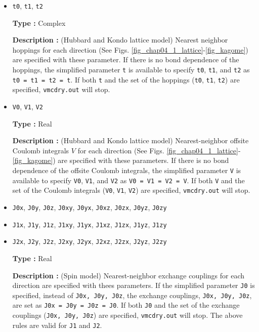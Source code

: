 \begin{itemize}
\item \verb|t0|,  \verb|t1|, \verb|t2|

{\bf Type :} Complex

{\bf Description :} (Hubbard and Kondo lattice model)
Nearest neighbor hoppings for each direction
(See Figs. \ref{fig_chap04_1_lattice}-\ref{fig_kagome})
are specified with these parameter.
If there is no bond dependence of the hoppings,
the simplified parameter \verb|t| is available to specify \verb|t0|,  \verb|t1|, and \verb|t2| as
\verb|t0 = t1 = t2 = t|.
If both \verb|t| and the set of the hoppings (\verb|t0|,  \verb|t1|, \verb|t2|) are specified,
\verb|vmcdry.out| will stop.

\item \verb|V0|,  \verb|V1|, \verb|V2|

{\bf Type :} Real

{\bf Description :} (Hubbard and Kondo lattice model)
Nearest-neighbor offsite Coulomb integrals $V$
 for each direction
(See Figs. \ref{fig_chap04_1_lattice}-\ref{fig_kagome})
are specified with these parameters.
If there is no bond dependence of the offsite Coulomb integrals,
the simplified parameter \verb|V| is available to specify \verb|V0|,  \verb|V1|, and \verb|V2| as
\verb|V0 = V1 = V2 = V|.
If both \verb|V| and the set of the Coulomb integrals (\verb|V0|,  \verb|V1|, \verb|V2|) are specified,
\verb|vmcdry.out| will stop.

\item \verb|J0x|, \verb|J0y|, \verb|J0z|, \verb|J0xy|, 
  \verb|J0yx|, \verb|J0xz|, \verb|J0zx|, \verb|J0yz|, \verb|J0zy|
\item \verb|J1x|, \verb|J1y|, \verb|J1z|, \verb|J1xy|, 
  \verb|J1yx|, \verb|J1xz|, \verb|J1zx|, \verb|J1yz|, \verb|J1zy|
\item \verb|J2x|, \verb|J2y|, \verb|J2z|, \verb|J2xy|, 
  \verb|J2yx|, \verb|J2xz|, \verb|J2zx|, \verb|J2yz|, \verb|J2zy|

{\bf Type :} Real

{\bf Description :} (Spin model)
Nearest-neighbor exchange couplings for each direction
are specified with thees parameters.
If the simplified parameter \verb|J0| is specified, instead of \verb|J0x, J0y, J0z|,
the exchange couplings, \verb|J0x, J0y, J0z|, are set as \verb|J0x = J0y = J0z = J0|.
If both \verb|J0| and the set of the exchange couplings (\verb|J0x, J0y, J0z|)
are specified, \verb|vmcdry.out| will stop.
The above rules are valid for \verb|J1| and \verb|J2|.


\end{itemize}
